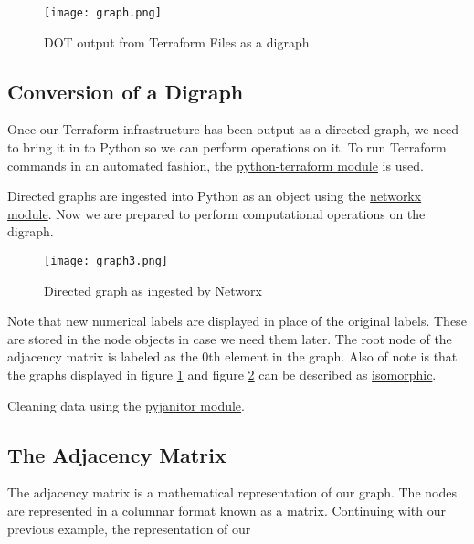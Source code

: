 \justifying
\begin{figure}[H]
	\texttt{[image: graph.png]}
	\caption{DOT output from Terraform Files as a digraph}
	\label{pygraph}
\end{figure}

\subsection{\label{sec:conversion}Conversion of a Digraph}

\justifying
Once our Terraform infrastructure has been output as a directed graph, we need to bring it in to Python so we can
perform operations on it. To run Terraform commands in an automated fashion, 
the \href{https://pypi.org/project/python-terraform/}{python-terraform module} is used.
\vspace{2mm}

\justifying
Directed graphs are ingested into Python as an object using the \href{https://pypi.org/project/networkx/}{networkx module}. Now we are prepared
to perform computational operations on the digraph.
\vspace{2mm}

\justifying
\begin{figure}[H]
    \texttt{[image: graph3.png]}
    \caption{Directed graph as ingested by Networx}
    \label{digraph}
\end{figure}

\justifying
Note that new numerical labels are displayed in place of the original labels. These are
stored in the node objects in case we need them later. The root node of the adjacency matrix is labeled
as the 0th element in the graph. Also of note is that the graphs displayed in figure \ref{pygraph} and figure \ref{digraph} can be described as \href{https://en.wikipedia.org/wiki/Graph\_isomorphism}{isomorphic}.
\vspace{2mm}

\justifying
Cleaning data using the \href{}{pyjanitor module}.
\vspace{2mm}

\subsection{\label{sec:adjacency}The Adjacency Matrix}

\justifying
The adjacency matrix is a mathematical representation of our graph. The nodes are represented in a
columnar format known as a matrix. Continuing with our previous example, the representation of our

